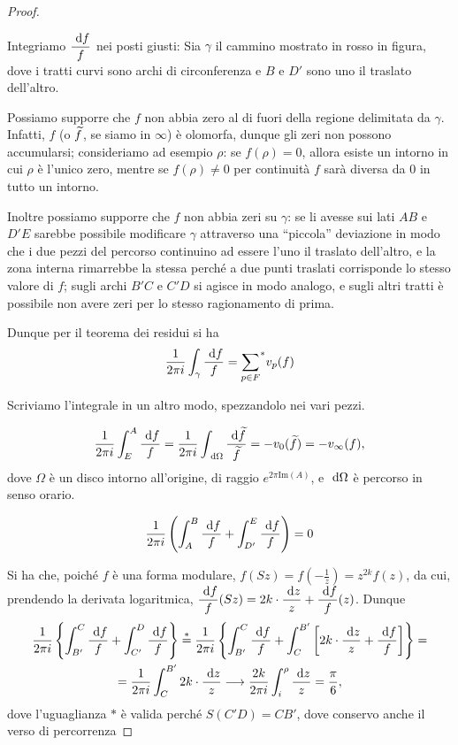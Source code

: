 \begin{proof}
	\begin{figure}
		
	\end{figure}
	Integriamo $\displaystyle \frac{\text{ d} f}{f}$ nei posti giusti: Sia $\gamma$ il cammino mostrato in rosso in figura,
	dove i tratti curvi sono archi di circonferenza e $B$ e $D'$ sono uno il traslato dell'altro.
	
	Possiamo supporre che $f$ non abbia zero al di fuori della regione delimitata da $\gamma$.
	Infatti, $f$ (o $\widetilde{f}$, se siamo in $\infty$) è olomorfa, dunque gli zeri non possono accumularsi;
	consideriamo ad esempio $\rho$: se $f(\rho)=0$, allora esiste un intorno in cui $\rho$ è l'unico zero,
	mentre se $f(\rho)\neq0$ per continuità $f$ sarà diversa da $0$ in tutto un intorno.
	
	Inoltre possiamo supporre che $f$ non abbia zeri su $\gamma$: se li avesse sui lati $AB$ e $D'E$
	sarebbe possibile modificare $\gamma$ attraverso una ``piccola'' deviazione in modo che i due pezzi del percorso
	continuino ad essere l'uno il traslato dell'altro, e la zona interna rimarrebbe la stessa perché 
	a due punti traslati corrisponde lo stesso valore di $f$; sugli archi $B'C$ e $C'D$ si agisce in modo analogo,
	e sugli altri tratti è possibile non avere zeri per lo stesso ragionamento di prima.
	
	Dunque per il teorema dei residui si ha
	\begin{equation}
		\frac{1}{2\pi i} \int_{\gamma} \frac{\text{ d} f}{f}={\sum_{p\in F}}^{*}v_p(f)
	\end{equation}
	
	Scriviamo l'integrale in un altro modo, spezzandolo nei vari pezzi.
	
	\begin{equation}
		\frac{1}{2\pi i}\int_E^A\frac{\text{ d} f}{f}=\frac{1}{2\pi i}\int_{\text{ d}\Omega}\frac{\text{ d} \widetilde{f}}{\widetilde{f}}=-v_0(\widetilde{f})=-v_\infty(f),
	\end{equation}
	dove $\Omega$ è un disco intorno all'origine, di raggio $e^{2\pi \mbox{Im}(A)}$, e $\text{ d}\Omega$ è percorso in senso orario.
	
	\begin{equation}
		\frac{1}{2\pi i}\left( \int_A^B\frac{\text{ d} f}{f} + \int_{D'}^E\frac{\text{ d} f}{f} \right) =0
	\end{equation}
	
	Si ha che, poiché $f$ è una forma modulare, $f(Sz)=f(-\frac{1}{z})=z^{2k}f(z)$, da cui, prendendo la derivata logaritmica,
	$\displaystyle\frac{\text{ d} f}{f}(Sz)=2k\cdot\frac{\text{ d} z}{z}+\frac{\text{ d} f}{f}(z)$. Dunque
	\begin{multline}
		\frac{1}{2\pi i}\left\{ \int_{B'}^C\frac{\de f}{f} + \int_{C'}^D\frac{\de f}{f} \right\} \overset{*}{=} %
		\frac{1}{2\pi i}\left\{ \int_{B'}^C\frac{\de f}{f} + \int_{C}^{B'} \left[2k \cdot \frac{\de z}{z} + \frac{\de f}{f}\right] \right\} = \\
		= \frac{1}{2\pi i}\int_{C}^{B'} 2k \cdot \frac{\de z}{z} \longrightarrow \frac{2k}{2\pi i}\int_i^\rho \frac{\de z}{z} = \frac{\pi}{6},
	\end{multline}
	dove l'uguaglianza $*$ è valida perché $S(C'D)=CB'$, dove conservo anche il verso di percorrenza
	

\end{proof}

